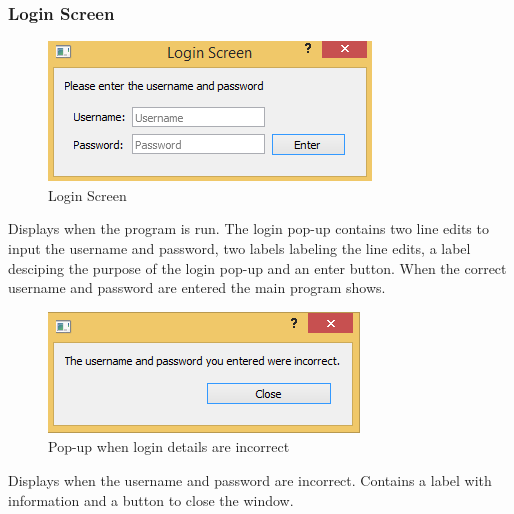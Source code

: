 \subsubsection{Login Screen}
\begin{figure}[H]
\includegraphics[width=\textwidth]{./Maintenance/Images/LoginScreen.png}
    \caption{Login Screen} \label{fig:login_screen}
\end{figure}

Displays when the program is run. The login pop-up contains two line edits to input the username and password, two labels labeling the line edits, a label desciping the purpose of the login pop-up and an enter button. When the correct username and password are entered the main program shows.

\begin{figure}[H]
\includegraphics[width=\textwidth]{./Maintenance/Images/LoginScreenIncorrect.png}
    \caption{Pop-up when login details are incorrect} \label{fig:login_screen_incorrect}
\end{figure}

Displays when the username and password are incorrect. Contains a label with information and a button to close the window.

